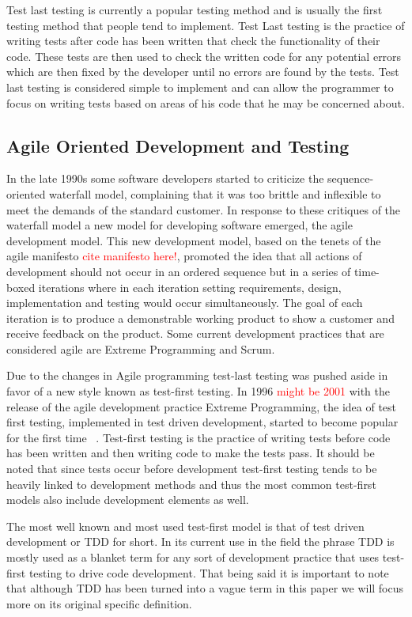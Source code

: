 \documentclass{sig-alternate}
\newcommand{\mycomment}[1]{\textcolor{red}{#1}}
\begin{document}
Test last testing is currently a popular testing method and is usually the first testing method that people tend to implement.  Test Last testing is the practice of writing tests after code has been written that check the functionality of their code.  These tests are then used to check the written code for any potential errors which are then fixed by the developer until no errors are found by the tests.  Test last testing is considered simple to implement and can allow the programmer to focus on writing tests based on areas of his code that he may be concerned about.

\subsection{Agile Oriented Development and Testing}

In the late 1990s some software developers started to criticize the sequence-oriented waterfall model, complaining that it was too brittle and inflexible to meet the demands of the standard customer.  In response to these critiques of the waterfall model a new model for developing software emerged, the agile development model.  This new development model, based on the tenets of the agile manifesto \mycomment{cite manifesto here!}, promoted the idea that all actions of development should not occur in an ordered sequence but in a series of time-boxed iterations where in each iteration setting requirements, design, implementation and testing would occur simultaneously.  The goal of each iteration is to produce a demonstrable working product to show a customer and receive feedback on the product.  Some current development practices that are considered agile are Extreme Programming and Scrum.

Due to the changes in Agile programming test-last testing was pushed aside in favor of a new style known as test-first testing.  In 1996 \mycomment{might be 2001} with the release of the agile development practice Extreme Programming, the idea of test first testing, implemented in test driven development, started to become popular for the first time ~\cite{Hammond:2012}. Test-first testing is the practice of writing tests before code has been written and then writing code to make the tests pass.  It should be noted that since tests occur before development test-first testing tends to be heavily linked to development methods and thus the most common test-first models also include development elements as well. 

The most well known and most used test-first model is that of test driven development or TDD for short.  In its current use in the field the phrase TDD is mostly used as a blanket term for any sort of development practice that uses test-first testing to drive code development. That being said it is important to note that although TDD has been turned into a vague term in this paper we will focus more on its original specific definition.   
\end{document}
